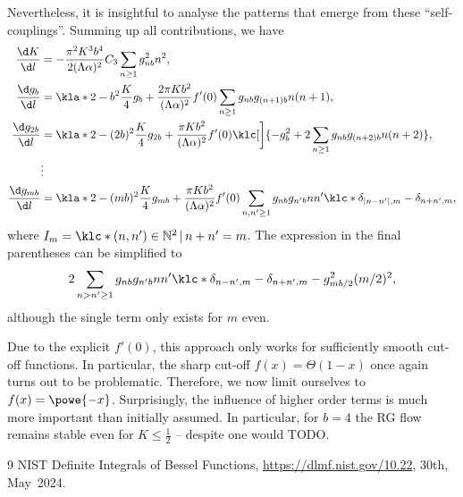 \documentclass[english, parskip=full]{scrartcl}
\begin{document}
Nevertheless, it is insightful to analyse the patterns that emerge from these ``self-couplings''.
Summing up all contributions, we have
\begin{align}
\frac{\d K}{\d l} &= -\frac{\pi^2K^3b^4}{2(\Lambda\alpha)^2} C_3 \sum_{n\ge 1} g_{nb}^2n^2,\\
\frac{\d g_b}{\d l} &= \kla*{2 - b^2 \frac{K}{4}} g_{b} + \frac{2\pi Kb^2}{(\Lambda\alpha)^2} f'(0) \sum_{n\ge 1} g_{nb} g_{(n+1)b} n(n+1),\\
\frac{\d g_{2b}}{\d l} &= \kla*{2 - (2b)^2 \frac{K}{4}} g_{2b} + \frac{\pi K b^2}{(\Lambda\alpha)^2} f'(0) \klc[\bigg]{-g_b^2 + 2 \sum_{n\ge 1} g_{nb} g_{(n+2)b} n(n+2)},\\
&\vdots\\
\frac{\d g_{mb}}{\d l} &= \kla*{2 - (mb)^2 \frac{K}{4}} g_{mb} + \frac{\pi Kb^2}{(\Lambda\alpha)^2} f'(0) \sum_{n,n'\ge 1} g_{nb} g_{n'b} nn' \klc*{ \delta_{|n-n'|,m} - \delta_{n+n',m} },
\end{align} %
where $I_m = \klc*{(n,n')\in \mathbb{N}^2\,\vert\,n+n'=m}$.
The expression in the final parentheses can be simplified to
\begin{align}
2\sum_{n> n'\ge 1} g_{nb} g_{n'b} nn' \klc*{\delta_{n-n',m} - \delta_{n+n',m}} - g_{mb/2}^2 (m/2)^2,
\end{align}
although the single term only exists for $m$ even.

Due to the explicit $f'(0)$, this approach only works for sufficiently smooth cut-off functions.
In particular, the sharp cut-off $f(x)=\Theta(1-x)$ once again turns out to be problematic.
Therefore, we now limit ourselves to $f(x)=\powe{-x}$.
Surprisingly, the influence of higher order terms is much more important than initially assumed.
In particular, for $b=4$ the RG flow remains stable even for $K\le \frac{1}{2}$ -- despite one would TODO.




\begin{thebibliography}{9}
 NIST Definite Integrals of Bessel Functions, \url{https://dlmf.nist.gov/10.22}, 30th,\,May~2024.
\end{thebibliography}
\end{document}
